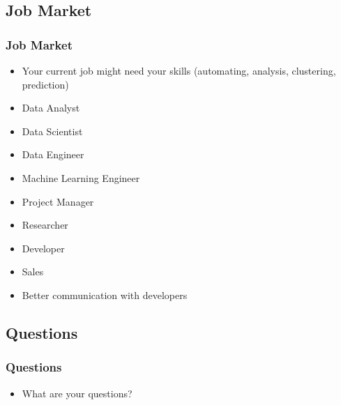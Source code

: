 \subsection{Job Market}
\begin{frame}\frametitle{Job Market}
   \begin{itemize}
      \item Your current job might need your skills (automating, analysis, clustering, prediction)
      \item Data Analyst
      \item Data Scientist
      \item Data Engineer
      \item Machine Learning Engineer
      \item Project Manager
      \item Researcher
      \item Developer
      \item Sales
      \item Better communication with developers
   \end{itemize}
\end{frame}

\subsection{Questions}
\begin{frame}\frametitle{Questions}
   \begin{itemize}
      \item What are your questions?
   \end{itemize}
\end{frame}



